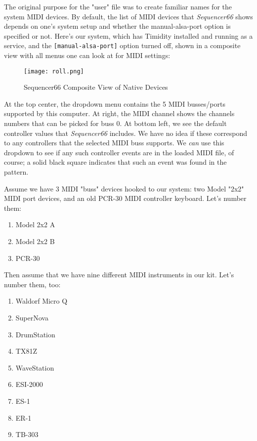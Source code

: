    The original purpose for the "user" file was to create familiar names for the
   system MIDI devices.
   By default, the list of MIDI devices that \textsl{Sequencer66} shows depends
   on one's system setup and whether the manual-alsa-port option is specified
   or not.  Here's our system, which has Timidity installed and running as a
   service, and the \texttt{[manual-alsa-port]} option turned off, shown in a
   composite view with all menus one can look at for MIDI settings:

\begin{figure}[H]
   \centering 
   \texttt{[image: roll.png]}
   \caption{Sequencer66 Composite View of Native Devices}
   \label{fig:seq66_manual_0_buss_dropdown}
\end{figure}

   At the top center, the dropdown menu contains the 5 MIDI busses/ports
   supported by this computer.  At right, the MIDI channel shows
   the channels numbers that can be picked for buss 0.  At bottom left, we see
   the default controller values that \textsl{Sequencer66} includes.  We have
   no idea if these correspond to any controllers that the selected MIDI buss
   supports.  We \textsl{can} use this dropdown to see if any such controller
   events are in the loaded MIDI file, of course; a solid black square
   indicates that such an event was found in the pattern.

   Assume we have 3 MIDI "buss" devices hooked to our system:
   two Model "2x2" MIDI port devices, and an old PCR-30 MIDI controller
   keyboard.  Let's number them:

   \begin{enumerate}
      \item Model 2x2 A
      \item Model 2x2 B
      \item PCR-30
   \end{enumerate}

   Then assume that we have nine different MIDI instruments in our kit.
   Let's number them, too:

   \begin{enumerate}
      \item Waldorf Micro Q
      \item SuperNova
      \item DrumStation
      \item TX81Z
      \item WaveStation
      \item ESI-2000
      \item ES-1
      \item ER-1
      \item TB-303
   \end{enumerate}

